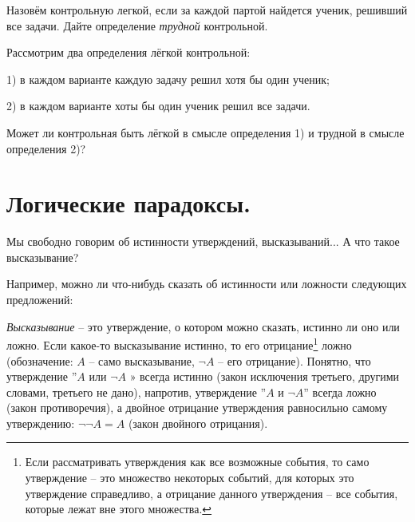 \begin{thm}
    Назовём контрольную легкой, если за каждой партой найдется ученик, решивший все задачи. Дайте определение \textit{трудной} контрольной.
\end{thm}

\begin{thm}
    Рассмотрим два определения лёгкой контрольной: 
    \par 1) в каждом варианте каждую задачу решил хотя бы один ученик;
    \par 2) в каждом варианте хоты бы один ученик решил все задачи. 
    \par Может ли контрольная быть лёгкой в смысле определения 1) и трудной в смысле определения 2)?
\end{thm}


\section{Логические парадоксы.} 

Мы свободно говорим об истинности утверждений, высказываний... А что такое высказывание?
\par
Например, можно ли что-нибудь сказать об истинности или ложности следующих предложений:

\begin{center}
\end{center}

\begin{center}
\end{center}

\textit{Высказывание} – это утверждение, о котором можно сказать, истинно ли оно или ложно. Если
какое-то высказывание истинно, то его отрицание\footnote{Если рассматривать утверждения как все возможные события, то само утверждение – это множество некоторых событий, для которых это утверждение справедливо, а отрицание данного утверждения – все события, которые лежат вне этого множества.} ложно (обозначение: $A$ – само высказывание,
$\neg A$ – его отрицание). Понятно, что утверждение ''$A$ или $\neg A$ » всегда истинно (закон исключения третьего, другими словами, третьего не дано), напротив, утверждение ''$A$ и $\neg A$'' всегда ложно (закон противоречия), а двойное отрицание утверждения равносильно самому утверждению: $\neg \neg A = A$ (закон двойного отрицания).

